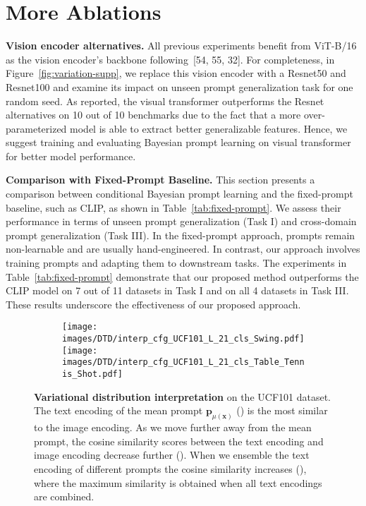 \documentclass[10pt,twocolumn,letterpaper]{article}
\newcommand{\x}{\mathbf{x}}
\newcommand{\p}{\mathbf{p}}
\begin{document}
\section{More Ablations}
\label{more_ablation}
\textbf{Vision encoder alternatives.}
All previous experiments benefit from ViT-B/16 as the vision encoder's backbone following~[\textcolor{refcolor}{54}, \textcolor{refcolor}{55}, \textcolor{refcolor}{32}]. For completeness, in Figure~\ref{fig:variation-supp}, we replace this vision encoder with a Resnet50 and Resnet100 and examine its impact on unseen prompt generalization task for one random seed. As reported, the visual transformer outperforms the Resnet alternatives on 10 out of 10 benchmarks due to the fact that a more over-parameterized model is able to extract better generalizable features.
Hence, we suggest training and evaluating Bayesian prompt learning on visual transformer for better model performance.

\textbf{Comparison with Fixed-Prompt Baseline.} This section presents a comparison between conditional Bayesian prompt learning and the fixed-prompt baseline, such as CLIP, as shown in Table~\ref{tab:fixed-prompt}. We assess their performance in terms of unseen prompt generalization (Task I) and cross-domain prompt generalization (Task III). In the fixed-prompt approach, prompts remain non-learnable and are usually hand-engineered. In contrast, our approach involves training prompts and adapting them to downstream tasks. The experiments in Table~\ref{tab:fixed-prompt} demonstrate that our proposed method outperforms the CLIP model on 7 out of 11 datasets in Task I and on all 4 datasets in Task III. These results underscore the effectiveness of our proposed approach. 

\begin{figure*}[t!]
\centering
\begin{subfigure}{0.96\linewidth}
  \centering
  \texttt{[image: images/DTD/interp\_cfg\_UCF101\_L\_21\_cls\_Swing.pdf]}
  \texttt{[image: images/DTD/interp\_cfg\_UCF101\_L\_21\_cls\_Table\_Tennis\_Shot.pdf]}
\end{subfigure}\vspace{-2mm}
\caption{\textbf{Variational distribution interpretation} on the UCF101 dataset. The text encoding of the mean prompt $\p_{\mu(\x)}$ () is the most similar to the image encoding. As we move further away from the mean prompt, the cosine similarity scores between the text encoding and image encoding decrease further ().
When we ensemble the text encoding of different prompts the cosine similarity increases (), where the maximum similarity is obtained when all text encodings are combined. 
}
\vspace{-2mm}
\label{fig:interpretation-2}
\end{figure*}
\end{document}
